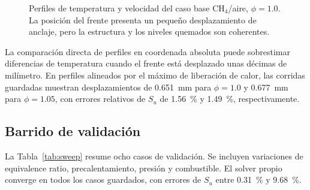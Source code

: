 \documentclass[12pt,a4paper]{article}
\begin{document}
\begin{figure}[H]
  \centering
  \caption{Perfiles de temperatura y velocidad del caso base CH$_4$/aire, $\phi=1.0$. La posición del frente presenta un pequeño desplazamiento de anclaje, pero la estructura y los niveles quemados son coherentes.}
  \label{fig:profiles_base}
\end{figure}

La comparación directa de perfiles en coordenada absoluta puede sobrestimar diferencias de temperatura cuando el frente está desplazado unas décimas de milímetro. En perfiles alineados por el máximo de liberación de calor, las corridas guardadas muestran desplazamientos de \SI{0.651}{mm} para $\phi=1.0$ y \SI{0.677}{mm} para $\phi=1.05$, con errores relativos de $S_u$ de \SI{1.56}{\percent} y \SI{1.49}{\percent}, respectivamente.

\subsection{Barrido de validación}

La Tabla~\ref{tab:sweep} resume ocho casos de validación. Se incluyen variaciones de equivalence ratio, precalentamiento, presión y combustible. El solver propio converge en todos los casos guardados, con errores de $S_u$ entre \SI{0.31}{\percent} y \SI{9.68}{\percent}.
\end{document}
